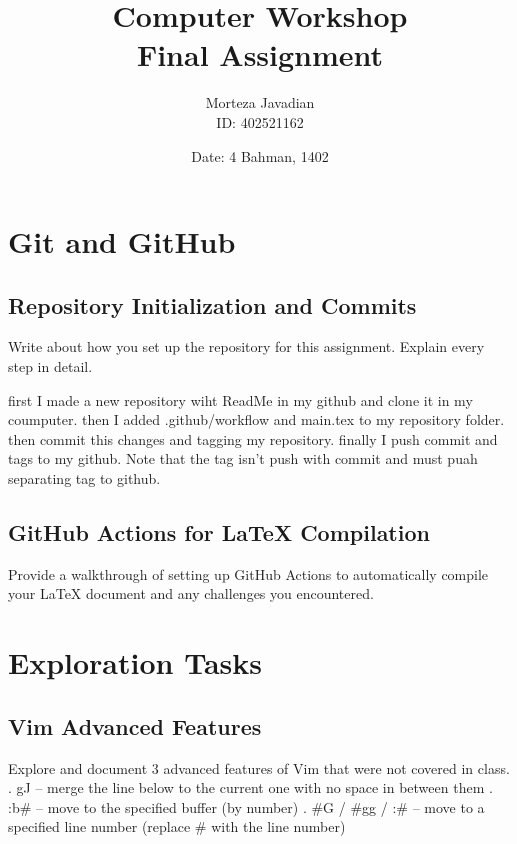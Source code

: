 \documentclass[titlepage]{article}
\title{\huge Computer Workshop\\Final Assignment}
\author{Morteza Javadian\\ID: 402521162}
\date{Date: 4 Bahman, 1402}
\begin{document}
	
	\maketitle
	
	\renewcommand{\contentsname }{ TABLE OF CONTENTS}
	
	\tableofcontents
	\let\LaTeXStandardTableOfContents\tableofcontents
	
	\renewcommand{\tableofcontents}
	{
		\begingroup
		\renewcommand{\bfseries}{\relax}
		\LaTeXStandardTableOfContents
		\endgroup
	}

	\newpage
	
	\section{Git and GitHub}
	\subsection{Repository Initialization and Commits}
	Write about how you set up the repository for this assignment. Explain every step in detail.
	
	first I made a new repository wiht ReadMe in my github and clone it in my coumputer. then I added .github/workflow and main.tex to my repository folder. then commit this changes and tagging my repository. finally I push commit and tags to my github. Note that the tag isn't push with commit and must puah separating tag to github.
	
	\subsection{GitHub Actions for LaTeX Compilation}
	Provide a walkthrough of setting up GitHub Actions to automatically compile your LaTeX document and any challenges you encountered.
	
	
	
	
	
	\section{Exploration Tasks}
	\subsection{Vim Advanced Features}
	Explore and document 3 advanced features of Vim that were not covered in class.
	. gJ – merge the line below to the current one with no space in between them
	. :b\#  – move to the specified buffer (by number)
	. \#G / \#gg / :\# – move to a specified line number (replace \# with the line number)
	
\end{document}

